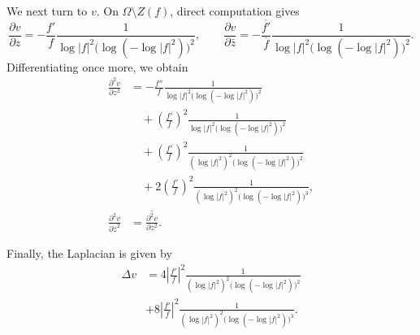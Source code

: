 \documentclass[12pt,twoside]{amsart}
\numberwithin{equation}{section}
\numberwithin{definition}{section} %
\begin{document}
We next turn to $v$. On $\Omega\setminus Z(f)$, direct computation gives
\begin{equation}\label{eq:v-first-derivatives}
\frac{\partial v}{\partial z}
=-\frac{f'}f
\frac1{\log|f|^2\bigl(\log(-\log|f|^2)\bigr)^2},
\qquad
\frac{\partial v}{\partial\bar z}
=-\frac{\overline{f'}}{\overline f}
\frac1{\log|f|^2\bigl(\log(-\log|f|^2)\bigr)^2}.
\end{equation}
Differentiating once more, we obtain
\begin{equation}\label{eq:v-pure-second-derivative}
\begin{aligned}
\frac{\partial^2v}{\partial z^2}
&=-\frac{f''}{f}
  \frac1{\log|f|^2\bigl(\log(-\log|f|^2)\bigr)^2}\\
&\quad+\left(\frac{f'}f\right)^2
  \frac1{\log|f|^2\bigl(\log(-\log|f|^2)\bigr)^2}\\
&\quad+\left(\frac{f'}f\right)^2
  \frac1{(\log|f|^2)^2\bigl(\log(-\log|f|^2)\bigr)^2}\\
&\quad+2\left(\frac{f'}f\right)^2
  \frac1{(\log|f|^2)^2\bigl(\log(-\log|f|^2)\bigr)^3},\\
\frac{\partial^2v}{\partial\bar z^2}
&=\overline{\frac{\partial^2v}{\partial z^2}}.
\end{aligned}
\end{equation}

Finally, the Laplacian is given by
\begin{equation}\label{eq:v-laplacian}
\begin{aligned}
\Delta v
&=4\left|\frac{f'}f\right|^2
\frac1{(\log|f|^2)^2\bigl(\log(-\log|f|^2)\bigr)^2}\\
&+8\left|\frac{f'}f\right|^2
\frac1{(\log|f|^2)^2\bigl(\log(-\log|f|^2)\bigr)^3}.
\end{aligned}
\end{equation}
\end{document}
